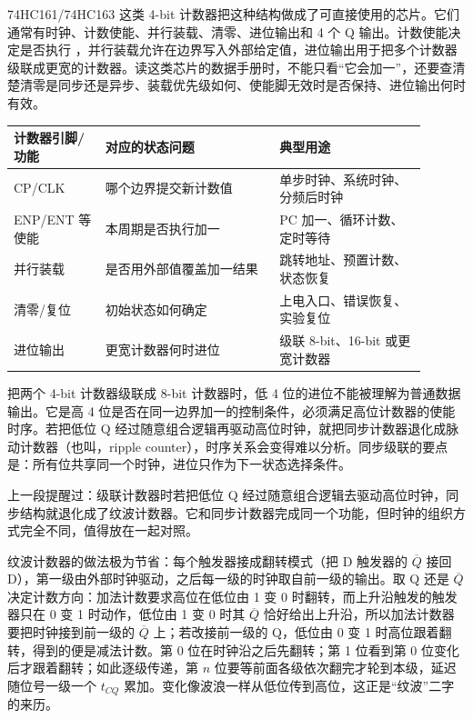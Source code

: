 74HC161/74HC163 这类 4-bit 计数器把这种结构做成了可直接使用的芯片。它们通常有时钟、计数使能、并行装载、清零、进位输出和 4 个 Q 输出。计数使能决定是否执行 ，并行装载允许在边界写入外部给定值，进位输出用于把多个计数器级联成更宽的计数器。读这类芯片的数据手册时，不能只看“它会加一”，还要查清楚清零是同步还是异步、装载优先级如何、使能脚无效时是否保持、进位输出何时有效。

\begin{longtable}{L{0.2\linewidth}L{0.38\linewidth}L{0.32\linewidth}}
\toprule
计数器引脚/功能 & 对应的状态问题 & 典型用途 \\
\midrule
CP/CLK & 哪个边界提交新计数值 & 单步时钟、系统时钟、分频后时钟 \\
ENP/ENT 等使能 & 本周期是否执行加一 & PC 加一、循环计数、定时等待 \\
并行装载 & 是否用外部值覆盖加一结果 & 跳转地址、预置计数、状态恢复 \\
清零/复位 & 初始状态如何确定 & 上电入口、错误恢复、实验复位 \\
进位输出 & 更宽计数器何时进位 & 级联 8-bit、16-bit 或更宽计数器 \\
\bottomrule
\end{longtable}

把两个 4-bit 计数器级联成 8-bit 计数器时，低 4 位的进位不能被理解为普通数据输出。它是高 4 位是否在同一边界加一的控制条件，必须满足高位计数器的使能时序。若把低位 Q 经过随意组合逻辑再驱动高位时钟，就把同步计数器退化成脉动计数器（也叫，ripple counter），时序关系会变得难以分析。同步级联的要点是：所有位共享同一个时钟，进位只作为下一状态选择条件。


上一段提醒过：级联计数器时若把低位 Q 经过随意组合逻辑去驱动高位时钟，同步结构就退化成了纹波计数器。它和同步计数器完成同一个功能，但时钟的组织方式完全不同，值得放在一起对照。

纹波计数器的做法极为节省：每个触发器接成翻转模式（把 D 触发器的 $\overline{Q}$ 接回 D），第一级由外部时钟驱动，之后每一级的时钟取自前一级的输出。取 Q 还是 $\overline{Q}$ 决定计数方向：加法计数要求高位在低位由 1 变 0 时翻转，而上升沿触发的触发器只在 0 变 1 时动作，低位由 1 变 0 时其 $\overline{Q}$ 恰好给出上升沿，所以加法计数器要把时钟接到前一级的 $\overline{Q}$ 上；若改接前一级的 Q，低位由 0 变 1 时高位跟着翻转，得到的便是减法计数。第 0 位在时钟沿之后先翻转；第 1 位看到第 0 位变化后才跟着翻转；如此逐级传递，第 $n$ 位要等前面各级依次翻完才轮到本级，延迟随位号一级一个 $t_{CQ}$ 累加。变化像波浪一样从低位传到高位，这正是“纹波”二字的来历。

